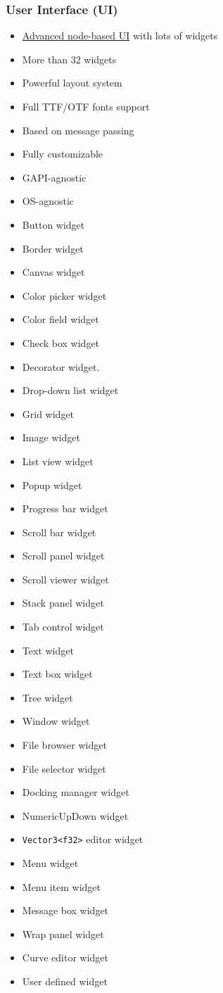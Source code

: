 \documentclass[
]{book}
\providecommand{\tightlist}{%
  \setlength{\itemsep}{0pt}\setlength{\parskip}{0pt}}
\theoremstyle{definition}
\theoremstyle{definition}
\theoremstyle{definition}
\theoremstyle{definition}
\theoremstyle{remark}
\begin{document}
\subsubsection{User Interface (UI)}\label{user-interface-ui}

\begin{itemize}
\tightlist
\item
  \href{https://github.com/FyroxEngine/Fyrox/tree/master/fyrox-ui}{Advanced node-based UI} with lots of widgets
\item
  More than 32 widgets
\item
  Powerful layout system
\item
  Full TTF/OTF fonts support
\item
  Based on message passing
\item
  Fully customizable
\item
  GAPI-agnostic
\item
  OS-agnostic
\item
  Button widget
\item
  Border widget
\item
  Canvas widget
\item
  Color picker widget
\item
  Color field widget
\item
  Check box widget
\item
  Decorator widget.
\item
  Drop-down list widget
\item
  Grid widget
\item
  Image widget
\item
  List view widget
\item
  Popup widget
\item
  Progress bar widget
\item
  Scroll bar widget
\item
  Scroll panel widget
\item
  Scroll viewer widget
\item
  Stack panel widget
\item
  Tab control widget
\item
  Text widget
\item
  Text box widget
\item
  Tree widget
\item
  Window widget
\item
  File browser widget
\item
  File selector widget
\item
  Docking manager widget
\item
  NumericUpDown widget
\item
  \texttt{Vector3\textless{}f32\textgreater{}} editor widget
\item
  Menu widget
\item
  Menu item widget
\item
  Message box widget
\item
  Wrap panel widget
\item
  Curve editor widget
\item
  User defined widget
\end{itemize}
\end{document}
